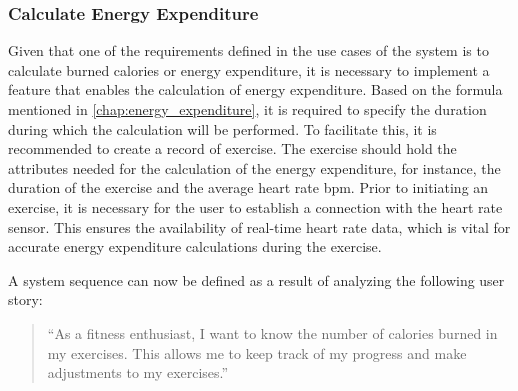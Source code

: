 \subsubsection{Calculate Energy Expenditure}
\label{chap:burnedcalories_design}
Given that one of the requirements defined in the use cases of the system is to calculate burned calories or energy expenditure, it is necessary to implement a feature that enables the calculation of energy expenditure. 
Based on the formula mentioned in \autoref{chap:energy_expenditure}, it is required to specify the duration during which the calculation will be performed. 
To facilitate this, it is recommended to create a record of exercise. The exercise should hold the attributes needed for the calculation of the energy expenditure, for instance, the duration of the exercise and the average heart rate bpm.
Prior to initiating an exercise, it is necessary for the user to establish a connection with the heart rate sensor. This ensures the availability of real-time heart rate data, which is vital for accurate energy expenditure calculations during the exercise.

A system sequence can now be defined as a result of analyzing the following user story:
\begin{quotation}
    \enquote{As a fitness enthusiast, I want to know the number of calories burned in my exercises. This allows me to keep track of my progress and make adjustments to my exercises.} 
\end{quotation}

